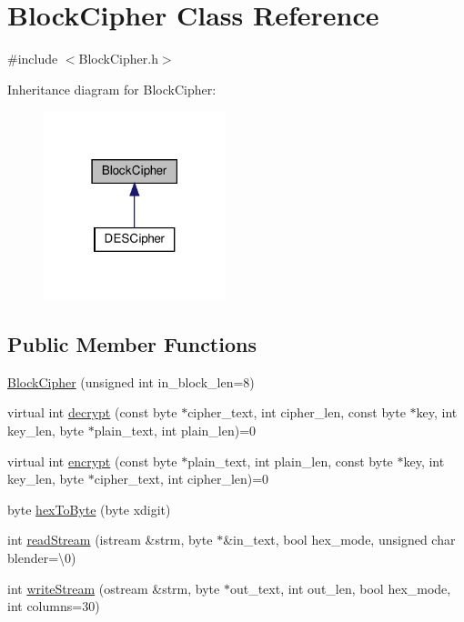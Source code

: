 \hypertarget{classBlockCipher}{}\section{Block\+Cipher Class Reference}
\label{classBlockCipher}


{\ttfamily \#include $<$Block\+Cipher.\+h$>$}



Inheritance diagram for Block\+Cipher\+:
\nopagebreak
\begin{figure}[H]
\begin{center}
\leavevmode
\includegraphics[width=150pt]{classBlockCipher__inherit__graph}
\end{center}
\end{figure}
\subsection*{Public Member Functions}
\begin{DoxyCompactItemize}
\item 
\hyperlink{classBlockCipher_a3c95996f1004e8bbf2b681168d1bd0a9}{Block\+Cipher} (unsigned int in\+\_\+block\+\_\+len=8)
\item 
virtual int \hyperlink{classBlockCipher_a8a401652231a372a0ec248ff0fb5487a}{decrypt} (const byte $\ast$cipher\+\_\+text, int cipher\+\_\+len, const byte $\ast$key, int key\+\_\+len, byte $\ast$plain\+\_\+text, int plain\+\_\+len)=0
\item 
virtual int \hyperlink{classBlockCipher_a702dd06a7078ef55c4e9a6482893b07d}{encrypt} (const byte $\ast$plain\+\_\+text, int plain\+\_\+len, const byte $\ast$key, int key\+\_\+len, byte $\ast$cipher\+\_\+text, int cipher\+\_\+len)=0
\item 
byte \hyperlink{classBlockCipher_ae55a65434bf1d4b59375916a0e58664c}{hex\+To\+Byte} (byte xdigit)
\item 
int \hyperlink{classBlockCipher_a0b64f6a987e85cfb75f0cc7ee035017e}{read\+Stream} (istream \&strm, byte $\ast$\&in\+\_\+text, bool hex\+\_\+mode, unsigned char blender=\textquotesingle{}\textbackslash{}0\textquotesingle{})
\item 
int \hyperlink{classBlockCipher_ad44860cf631022230dfbea6f654dc1a2}{write\+Stream} (ostream \&strm, byte $\ast$out\+\_\+text, int out\+\_\+len, bool hex\+\_\+mode, int columns=30)
\end{DoxyCompactItemize}

